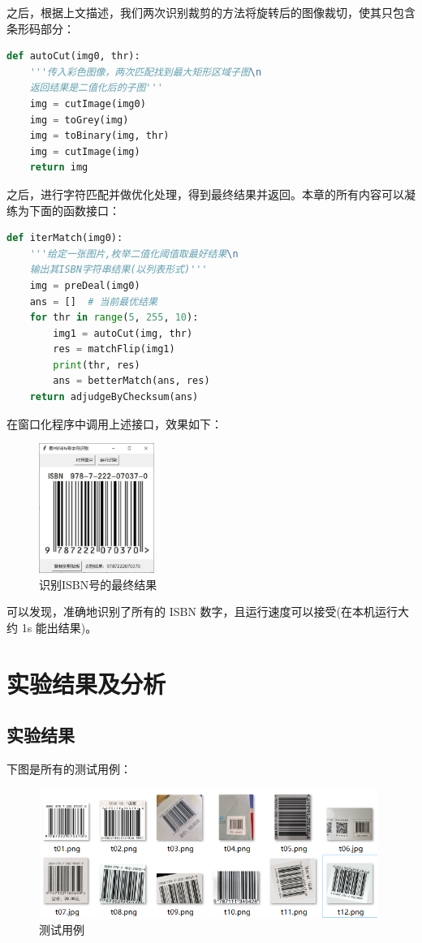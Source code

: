 \documentclass{ctexart}
\begin{document}
之后，根据上文描述，我们两次识别裁剪的方法将旋转后的图像裁切，使其只包含条形码部分：

\begin{lstlisting}[language=python]
def autoCut(img0, thr):
    '''传入彩色图像，两次匹配找到最大矩形区域子图\n
    返回结果是二值化后的子图'''
    img = cutImage(img0)
    img = toGrey(img)
    img = toBinary(img, thr)
    img = cutImage(img)
    return img
\end{lstlisting}

之后，进行字符匹配并做优化处理，得到最终结果并返回。本章的所有内容可以凝练为下面的函数接口：

\begin{lstlisting}[language=python]
def iterMatch(img0):
    '''给定一张图片,枚举二值化阈值取最好结果\n
    输出其ISBN字符串结果(以列表形式)'''
    img = preDeal(img0)
    ans = []  # 当前最优结果
    for thr in range(5, 255, 10):
        img1 = autoCut(img, thr)
        res = matchFlip(img1)
        print(thr, res)
        ans = betterMatch(ans, res)
    return adjudgeByChecksum(ans)
\end{lstlisting}

在窗口化程序中调用上述接口，效果如下：
\begin{figure}[H]
    \centering
    \includegraphics[height=120pt]{sample_stdout}
    \caption{识别ISBN号的最终结果}
\end{figure}

可以发现，准确地识别了所有的 ISBN 数字，且运行速度可以接受(在本机运行大约 1s 能出结果)。

\section{实验结果及分析}
\subsection{实验结果}

下图是所有的测试用例：

\begin{figure}[H]
    \centering
    \includegraphics[height=120pt]{test_raw}
    \caption{测试用例}
\end{figure}
\end{document}
